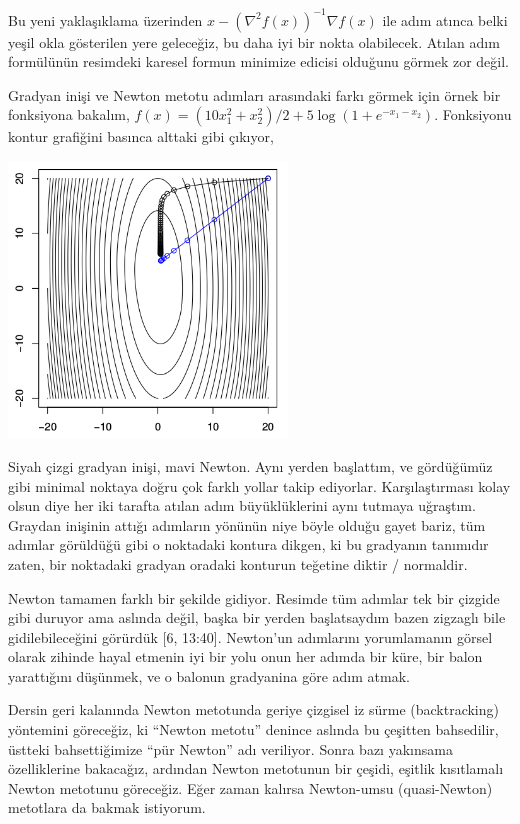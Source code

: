 \documentclass[12pt,fleqn]{article}\usepackage{../../common}
\begin{document}
Bu yeni yaklaşıklama üzerinden $x - (\nabla^2 f(x))^{-1}\nabla f(x)$ ile
adım atınca belki yeşil okla gösterilen yere geleceğiz, bu daha iyi bir
nokta olabilecek. Atılan adım formülünün resimdeki karesel formun minimize
edicisi olduğunu görmek zor değil.

Gradyan inişi ve Newton metotu adımları arasındaki farkı görmek için örnek
bir fonksiyona bakalım, $f(x) = (10 x_1^2 + x_2^2)/2 + 5 \log (1+e^{-x_1 - x_2})$. 
Fonksiyonu kontur grafiğini basınca alttaki gibi çıkıyor, 

\includegraphics[width=20em]{func_35_newton_03.png}

Siyah çizgi gradyan inişi, mavi Newton. Aynı yerden başlattım, ve
gördüğümüz gibi minimal noktaya doğru çok farklı yollar takip
ediyorlar. Karşılaştırması kolay olsun diye her iki tarafta atılan adım
büyüklüklerini aynı tutmaya uğraştım. Graydan inişinin attığı adımların
yönünün niye böyle olduğu gayet bariz, tüm adımlar görüldüğü gibi o
noktadaki kontura dikgen, ki bu gradyanın tanımıdır zaten, bir noktadaki
gradyan oradaki konturun teğetine diktir / normaldir. 

Newton tamamen farklı bir şekilde gidiyor. Resimde tüm adımlar tek bir
çizgide gibi duruyor ama aslında değil, başka bir yerden başlatsaydım bazen
zigzaglı bile gidilebileceğini görürdük [6, 13:40]. Newton'un adımlarını
yorumlamanın görsel olarak zihinde hayal etmenin iyi bir yolu onun her
adımda bir küre, bir balon yarattığını düşünmek, ve o balonun gradyanina
göre adım atmak. 

Dersin geri kalanında Newton metotunda geriye çizgisel iz sürme
(backtracking) yöntemini göreceğiz, ki ``Newton metotu'' denince aslında bu
çeşitten bahsedilir, üstteki bahsettiğimize ``pür Newton'' adı
veriliyor. Sonra bazı yakınsama özelliklerine bakacağız, ardından Newton
metotunun bir çeşidi, eşitlik kısıtlamalı Newton metotunu göreceğiz. Eğer
zaman kalırsa Newton-umsu (quasi-Newton) metotlara da bakmak istiyorum.
\end{document}
